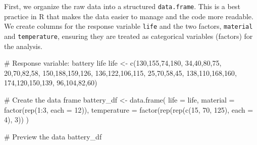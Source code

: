 \documentclass[
  letterpaper,
  DIV=11,
  numbers=noendperiod]{scrreprt}
\newenvironment{Shaded}{\begin{snugshade}}{\end{snugshade}}
\newcommand{\AttributeTok}[1]{\textcolor[rgb]{0.40,0.45,0.13}{#1}}
\newcommand{\CommentTok}[1]{\textcolor[rgb]{0.37,0.37,0.37}{#1}}
\newcommand{\DecValTok}[1]{\textcolor[rgb]{0.68,0.00,0.00}{#1}}
\newcommand{\FunctionTok}[1]{\textcolor[rgb]{0.28,0.35,0.67}{#1}}
\newcommand{\NormalTok}[1]{\textcolor[rgb]{0.00,0.23,0.31}{#1}}
\newcommand{\OtherTok}[1]{\textcolor[rgb]{0.00,0.23,0.31}{#1}}
\newcommand{\SpecialCharTok}[1]{\textcolor[rgb]{0.37,0.37,0.37}{#1}}
\begin{document}
First, we organize the raw data into a structured \texttt{data.frame}.
This is a best practice in R that makes the data easier to manage and
the code more readable. We create columns for the response variable
\texttt{life} and the two factors, \texttt{material} and
\texttt{temperature}, ensuring they are treated as categorical variables
(factors) for the analysis.

\begin{Shaded}
\begin{Highlighting}[]
\CommentTok{\# Response variable: battery life}
\NormalTok{life }\OtherTok{\textless{}{-}} \FunctionTok{c}\NormalTok{(}\DecValTok{130}\NormalTok{,}\DecValTok{155}\NormalTok{,}\DecValTok{74}\NormalTok{,}\DecValTok{180}\NormalTok{,  }\DecValTok{34}\NormalTok{,}\DecValTok{40}\NormalTok{,}\DecValTok{80}\NormalTok{,}\DecValTok{75}\NormalTok{,   }\DecValTok{20}\NormalTok{,}\DecValTok{70}\NormalTok{,}\DecValTok{82}\NormalTok{,}\DecValTok{58}\NormalTok{,}
          \DecValTok{150}\NormalTok{,}\DecValTok{188}\NormalTok{,}\DecValTok{159}\NormalTok{,}\DecValTok{126}\NormalTok{, }\DecValTok{136}\NormalTok{,}\DecValTok{122}\NormalTok{,}\DecValTok{106}\NormalTok{,}\DecValTok{115}\NormalTok{, }\DecValTok{25}\NormalTok{,}\DecValTok{70}\NormalTok{,}\DecValTok{58}\NormalTok{,}\DecValTok{45}\NormalTok{,}
          \DecValTok{138}\NormalTok{,}\DecValTok{110}\NormalTok{,}\DecValTok{168}\NormalTok{,}\DecValTok{160}\NormalTok{, }\DecValTok{174}\NormalTok{,}\DecValTok{120}\NormalTok{,}\DecValTok{150}\NormalTok{,}\DecValTok{139}\NormalTok{, }\DecValTok{96}\NormalTok{,}\DecValTok{104}\NormalTok{,}\DecValTok{82}\NormalTok{,}\DecValTok{60}\NormalTok{)}

\CommentTok{\# Create the data frame}
\NormalTok{battery\_df }\OtherTok{\textless{}{-}} \FunctionTok{data.frame}\NormalTok{(}
  \AttributeTok{life =}\NormalTok{ life,}
  \AttributeTok{material =} \FunctionTok{factor}\NormalTok{(}\FunctionTok{rep}\NormalTok{(}\DecValTok{1}\SpecialCharTok{:}\DecValTok{3}\NormalTok{, }\AttributeTok{each =} \DecValTok{12}\NormalTok{)),}
  \AttributeTok{temperature =} \FunctionTok{factor}\NormalTok{(}\FunctionTok{rep}\NormalTok{(}\FunctionTok{rep}\NormalTok{(}\FunctionTok{c}\NormalTok{(}\DecValTok{15}\NormalTok{, }\DecValTok{70}\NormalTok{, }\DecValTok{125}\NormalTok{), }\AttributeTok{each =} \DecValTok{4}\NormalTok{), }\DecValTok{3}\NormalTok{))}
\NormalTok{)}

\CommentTok{\# Preview the data}
\NormalTok{battery\_df}
\end{Highlighting}
\end{Shaded}
\end{document}
